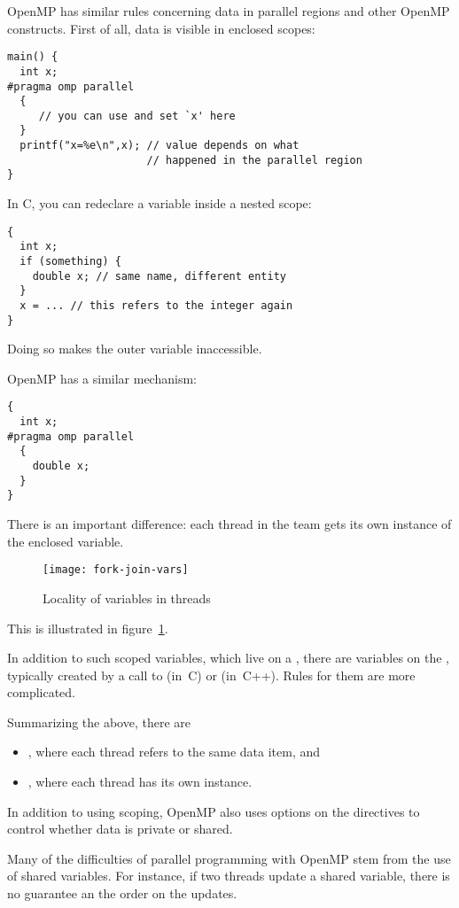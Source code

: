 OpenMP has similar rules concerning data in parallel regions
and other OpenMP constructs. First of all, data is visible
in enclosed scopes:
\begin{lstlisting}
main() {
  int x;
#pragma omp parallel
  {
     // you can use and set `x' here
  }
  printf("x=%e\n",x); // value depends on what
                      // happened in the parallel region
}
\end{lstlisting}

In C, you can redeclare a variable inside a nested scope:
\begin{lstlisting}
{
  int x;
  if (something) {
    double x; // same name, different entity
  }
  x = ... // this refers to the integer again
}
\end{lstlisting}
Doing so makes the outer variable inaccessible.

OpenMP has a similar mechanism:
\begin{lstlisting}
{
  int x;
#pragma omp parallel
  {
    double x;
  }
}
\end{lstlisting}
There is an important difference: each thread in the team
gets its own instance of the enclosed variable.

\begin{figure}[ht]
\texttt{[image: fork-join-vars]}
\caption{Locality of variables in threads}
\label{fig:threadvars}
\end{figure}
%
This is illustrated in figure~\ref{fig:threadvars}.

In addition to such scoped variables, which live on a ,
there are variables on the
, typically created by a call to 
(in~C) or  (in~C++). Rules for them are more complicated.

Summarizing the above, there are
\begin{itemize}
\item {},
  where each thread refers to the same data item, and 
\item {},
  where each thread has its own instance.
\end{itemize}
In addition to using scoping, OpenMP also uses options on the directives
to control whether data is private or shared.

Many of the difficulties of parallel programming with OpenMP stem
from the use of shared variables. For instance, if two threads
update a shared variable, there is no guarantee an the order on the updates.

